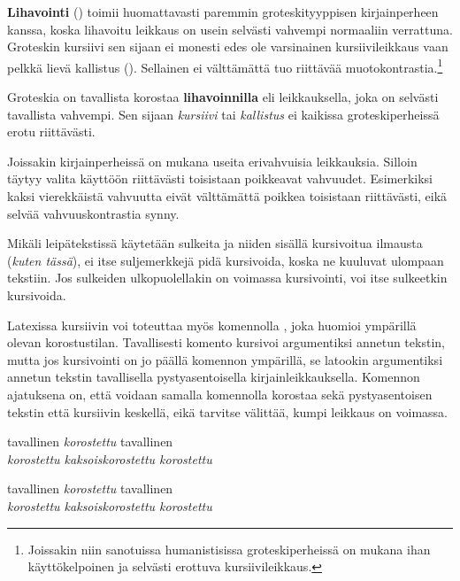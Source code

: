 \textbf{Lihavointi} () toimii huomattavasti paremmin
groteskityyppisen kirjainperheen kanssa, koska lihavoitu leikkaus on
usein selvästi vahvempi normaaliin verrattuna. Groteskin kursiivi sen
sijaan ei monesti edes ole varsinainen kursiivileikkaus vaan pelkkä
lievä kallistus (). Sellainen ei välttämättä tuo
riittävää muotokontrastia.\footnote{Joissakin niin sanotuissa
  humanistisissa groteskiperheissä on mukana ihan käyttökelpoinen ja
  selvästi erottuva kursiivileikkaus.}

\begin{tulossis}
  \sffamily Groteskia on tavallista korostaa \textbf{lihavoinnilla} eli
  leikkauksella, joka on selvästi tavallista vahvempi. Sen sijaan
  \textit{kursiivi} tai \textsl{kallistus} ei kaikissa groteskiperheissä
  erotu riittävästi.
\end{tulossis}

Joissakin kirjainperheissä on mukana useita erivahvuisia leikkauksia.
Silloin täytyy valita käyttöön riittävästi toisistaan poikkeavat
vahvuudet. Esimerkiksi kaksi vierekkäistä vahvuutta eivät välttämättä
poikkea toisistaan riittävästi, eikä selvää vahvuuskontrastia synny.

Mikäli leipätekstissä käytetään sulkeita ja niiden sisällä kursivoitua
ilmausta (\textit{kuten tässä}), ei itse suljemerkkejä pidä kursivoida,
koska ne kuuluvat ulompaan tekstiin. Jos sulkeiden ulkopuolellakin on
voimassa kursivointi, voi itse sulkeetkin kursivoida.

Latexissa kursiivin voi toteuttaa myös komennolla , joka
huomioi ympärillä olevan korostustilan. Tavallisesti komento kursivoi
argumentiksi annetun tekstin, mutta jos kursivointi on jo päällä
komennon ympärillä, se latookin argumentiksi annetun tekstin
tavallisella pystyasentoisella kirjainleikkauksella. Komennon ajatuksena
on, että voidaan samalla komennolla korostaa sekä pystyasentoisen
tekstin että kursiivin keskellä, eikä tarvitse välittää, kumpi leikkaus
on voimassa.

\begin{koodilohkosis}
  tavallinen \emph{korostettu} tavallinen \\
  \emph{korostettu \emph{kaksoiskorostettu} korostettu}
\end{koodilohkosis}

\begin{tulossis}
  tavallinen \emph{korostettu} tavallinen \\
  \emph{korostettu \emph{kaksoiskorostettu} korostettu}
\end{tulossis}

